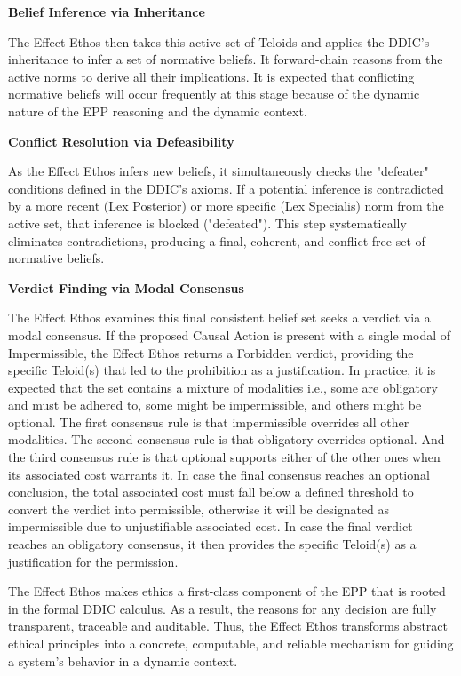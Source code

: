 \textbf{Belief Inference via Inheritance}

The Effect Ethos then takes this active set of Teloids and applies the DDIC's inheritance to infer a set of normative beliefs. It forward-chain reasons from the active norms to derive all their implications. It is expected that conflicting normative beliefs will occur frequently at this stage because of the dynamic nature of the EPP reasoning and the dynamic context.  

\textbf{Conflict Resolution via Defeasibility}

As the Effect Ethos infers new beliefs, it simultaneously checks the "defeater" conditions defined in the DDIC's axioms. If a potential inference is contradicted by a more recent (Lex Posterior) or more specific (Lex Specialis) norm from the active set, that inference is blocked ("defeated"). This step systematically eliminates contradictions, producing a final, coherent, and conflict-free set of normative beliefs.

\textbf{Verdict Finding via Modal Consensus}

The Effect Ethos examines this final consistent belief set seeks a verdict via a modal consensus. If the proposed Causal Action is present with a single modal of Impermissible, the Effect Ethos returns a Forbidden verdict, providing the specific Teloid(s) that led to the prohibition as a justification. In practice, it is expected that the set contains a mixture of modalities i.e., some are obligatory and must be adhered to, some might be impermissible, and others might be optional. The first consensus rule is that impermissible overrides all other modalities. The second  consensus rule is that  obligatory overrides optional. And the third consensus rule is that optional supports either of the other ones when its associated cost warrants it. In case the final consensus reaches an optional conclusion, the total  associated cost must fall below a defined threshold to convert the verdict into permissible, otherwise it will be designated as impermissible due to unjustifiable associated cost. In case the final verdict reaches an obligatory consensus, it then provides the specific Teloid(s) as a justification for the permission.

The Effect Ethos makes ethics a first-class component of the EPP that is rooted in the formal DDIC calculus. As a result, the reasons for any decision are fully transparent, traceable and auditable. Thus, the Effect Ethos  transforms abstract ethical principles into a concrete, computable, and reliable mechanism for guiding a system's behavior in a dynamic context.


